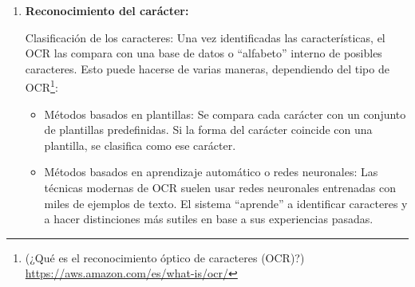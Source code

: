 \begin{enumerate}
	\item \textbf{Reconocimiento del carácter:}
	
	Clasificación de los caracteres: Una vez identificadas las características, el OCR las compara con una base de datos o ``alfabeto'' interno de posibles caracteres. Esto puede hacerse de varias maneras, dependiendo del tipo de OCR\footnote{(¿Qué es el reconocimiento óptico de caracteres (OCR)?) \url{https://aws.amazon.com/es/what-is/ocr/} }:
	\begin{itemize}
		\item Métodos basados en plantillas: Se compara cada carácter con un conjunto de plantillas predefinidas. Si la forma del carácter coincide con una plantilla, se clasifica como ese carácter.
		\item Métodos basados en aprendizaje automático o redes neuronales: Las técnicas modernas de OCR suelen usar redes neuronales entrenadas con miles de ejemplos de texto. El sistema ``aprende'' a identificar caracteres y a hacer distinciones más sutiles en base a sus experiencias pasadas.
	\end{itemize}

	
	
\end{enumerate}
